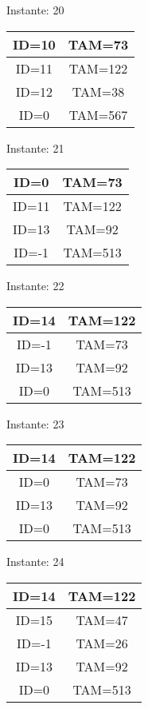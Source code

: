 \documentclass[10pt,a4paper]{article}
\begin{document}
\pagebreak
\begin{center}

Instante: 20

\begin{tabular}{|c|c|}
\hline
ID=10 & TAM=73 \\ \hline
ID=11 & TAM=122 \\ \hline
ID=12 & TAM=38 \\ \hline
ID=0 & TAM=567 \\ \hline
\end{tabular}
\end{center}
\pagebreak
\begin{center}

Instante: 21

\begin{tabular}{|c|c|}
\hline
ID=0 & TAM=73 \\ \hline
ID=11 & TAM=122 \\ \hline
ID=13 & TAM=92 \\ \hline
ID=-1 & TAM=513 \\ \hline
\end{tabular}
\end{center}
\pagebreak
\begin{center}

Instante: 22

\begin{tabular}{|c|c|}
\hline
ID=14 & TAM=122 \\ \hline
ID=-1 & TAM=73 \\ \hline
ID=13 & TAM=92 \\ \hline
ID=0 & TAM=513 \\ \hline
\end{tabular}
\end{center}
\pagebreak
\begin{center}

Instante: 23

\begin{tabular}{|c|c|}
\hline
ID=14 & TAM=122 \\ \hline
ID=0 & TAM=73 \\ \hline
ID=13 & TAM=92 \\ \hline
ID=0 & TAM=513 \\ \hline
\end{tabular}
\end{center}
\pagebreak
\begin{center}

Instante: 24

\begin{tabular}{|c|c|}
\hline
ID=14 & TAM=122 \\ \hline
ID=15 & TAM=47 \\ \hline
ID=-1 & TAM=26 \\ \hline
ID=13 & TAM=92 \\ \hline
ID=0 & TAM=513 \\ \hline
\end{tabular}
\end{center}
\end{document}
